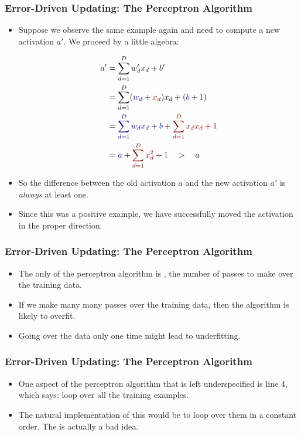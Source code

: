 \documentclass[trans]{beamer}
\begin{document}
\begin{frame}
  \frametitle{Error-Driven Updating: The Perceptron Algorithm}
\begin{itemize}
\item Suppose we observe the same example again and need to compute a
new activation $a'$.  We proceed by a little algebra:
\begin{scriptsize}
\begin{align}
a'
&= \sum_{d=1}^D w'_d x_d + b' \\
&= \sum_{d=1}^D (\textcolor{darkblue}{w_d} + \textcolor{darkred}{x_d}) x_d + (\textcolor{darkblue}{b} + \textcolor{darkred}{1}) \\
&= \textcolor{darkblue}{\sum_{d=1}^D w_d x_d + b} + \textcolor{darkred}{\sum_{d=1}^D x_d x_d + 1} \\
&= \textcolor{darkblue}{a} + \textcolor{darkred}{\sum_{d=1}^D x_d^2 + 1}
\quad > \quad a
\end{align}
\end{scriptsize}
\item 
So the difference between the old activation $a$ and the new
activation $a'$ is \emph{always} at least one.
\item   Since this
was a positive example, we have successfully moved the activation in
the proper direction.
\end{itemize}
\end{frame}

\begin{frame}
  \frametitle{Error-Driven Updating: The Perceptron Algorithm}
\begin{itemize}
\item
The only  of the perceptron algorithm is
, the number of passes to make over the training data.
\item If we make many many passes over the training data, then the algorithm
is likely to overfit.
\item Going
over the data only one time might lead to underfitting.  
\end{itemize}

\end{frame}

\begin{frame}
  \frametitle{Error-Driven Updating: The Perceptron Algorithm}
\begin{itemize}
\item
One aspect of the perceptron algorithm that is left underspecified is
line 4, which says: loop over all the training examples. 
\item  The natural
implementation of this would be to loop over them in a constant
order.  The is actually a bad idea.
\end{itemize}
\end{frame}
\end{document}
